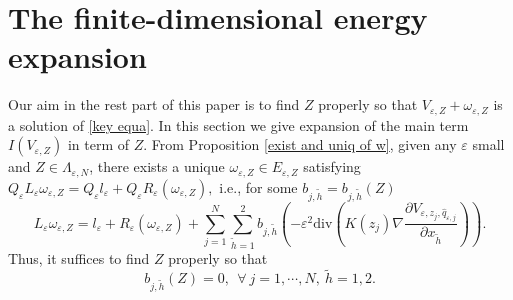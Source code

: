 \documentclass[12pt,reqno]{amsart}
\numberwithin{equation}{section}
\theoremstyle{definition}
\theoremstyle{remark}
\begin{document}
\section{The finite-dimensional energy expansion}

Our aim in the rest part of this paper is to find $Z$ properly so that $V_{\varepsilon, Z}+\omega_{\varepsilon, Z}$ is a solution of \eqref{key equa}.  In this section we give expansion of the main term $I(V_{\varepsilon, Z})$ in term of $Z$. From Proposition \ref{exist and uniq of w}, given any $ \varepsilon $ small and $ Z\in \Lambda_{\varepsilon, N} $, there exists a unique $ \omega_{\varepsilon,Z}\in E_{\varepsilon,Z} $ satisfying $ Q_\varepsilon L_\varepsilon \omega_{\varepsilon,Z}=Q_\varepsilon l_\varepsilon+Q_\varepsilon R_\varepsilon(\omega_{\varepsilon,Z}), $
i.e., for some $ b_{j,\tilde{h}}=b_{j,\tilde{h}}(Z) $
\begin{equation*}
 L_\varepsilon \omega_{\varepsilon,Z}= l_\varepsilon+  R_\varepsilon(\omega_{\varepsilon,Z})+\sum_{j=1}^N\sum_{\tilde{h}=1}^2b_{j,\tilde{h}}\left( -\varepsilon^2\text{div}\left (K(z_j)\nabla   \frac{\partial V_{\varepsilon, z_j, \hat{q}_{\varepsilon,j}}}{\partial x_{\tilde{h}}}\right )\right).
\end{equation*}
Thus, it suffices to find $Z$ properly so that
\begin{equation*}
 b_{j,\tilde{h}}(Z)=0,\ \ \forall\ j=1,\cdots,N,\ \tilde{h}=1,2.
\end{equation*}
\end{document}
